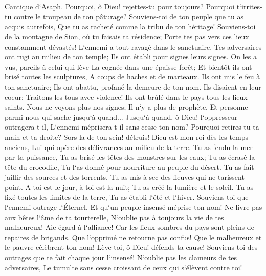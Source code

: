 \chapter{}

\verse Cantique d`Asaph. Pourquoi, ô Dieu! rejettes-tu pour toujours? Pourquoi t`irrites-tu contre le troupeau de ton pâturage? 
\verse Souviens-toi de ton peuple que tu as acquis autrefois, Que tu as racheté comme la tribu de ton héritage! Souviens-toi de la montagne de Sion, où tu faisais ta résidence; 
\verse Porte tes pas vers ces lieux constamment dévastés! L`ennemi a tout ravagé dans le sanctuaire. 
\verse Tes adversaires ont rugi au milieu de ton temple; Ils ont établi pour signes leurs signes. 
\verse On les a vus, pareils à celui qui lève La cognée dans une épaisse forêt; 
\verse Et bientôt ils ont brisé toutes les sculptures, A coups de haches et de marteaux. 
\verse Ils ont mis le feu à ton sanctuaire; Ils ont abattu, profané la demeure de ton nom. 
\verse Ils disaient en leur coeur: Traitons-les tous avec violence! Ils ont brûlé dans le pays tous les lieux saints. 
\verse Nous ne voyons plus nos signes; Il n`y a plus de prophète, Et personne parmi nous qui sache jusqu`à quand... 
\verse Jusqu`à quand, ô Dieu! l`oppresseur outragera-t-il, L`ennemi méprisera-t-il sans cesse ton nom? 
\verse Pourquoi retires-tu ta main et ta droite? Sors-la de ton sein! détruis! 
\verse Dieu est mon roi dès les temps anciens, Lui qui opère des délivrances au milieu de la terre. 
\verse Tu as fendu la mer par ta puissance, Tu as brisé les têtes des monstres sur les eaux; 
\verse Tu as écrasé la tête du crocodile, Tu l`as donné pour nourriture au peuple du désert. 
\verse Tu as fait jaillir des sources et des torrents. Tu as mis à sec des fleuves qui ne tarissent point. 
\verse A toi est le jour, à toi est la nuit; Tu as créé la lumière et le soleil. 
\verse Tu as fixé toutes les limites de la terre, Tu as établi l`été et l`hiver. 
\verse Souviens-toi que l`ennemi outrage l`Éternel, Et qu`un peuple insensé méprise ton nom! 
\verse Ne livre pas aux bêtes l`âme de ta tourterelle, N`oublie pas à toujours la vie de tes malheureux! 
\verse Aie égard à l`alliance! Car les lieux sombres du pays sont pleins de repaires de brigands. 
\verse Que l`opprimé ne retourne pas confus! Que le malheureux et le pauvre célèbrent ton nom! 
\verse Lève-toi, ô Dieu! défends ta cause! Souviens-toi des outrages que te fait chaque jour l`insensé! 
\verse N`oublie pas les clameurs de tes adversaires, Le tumulte sans cesse croissant de ceux qui s`élèvent contre toi! 

